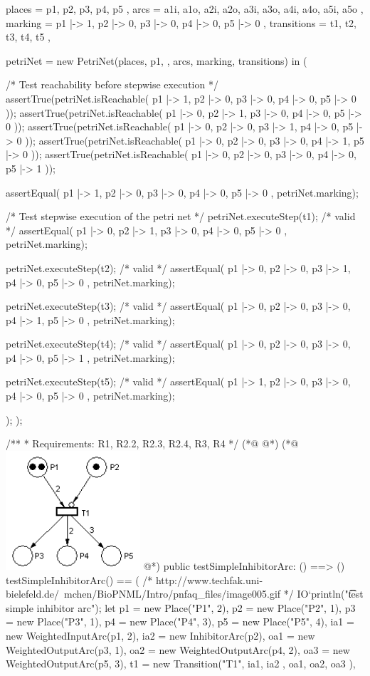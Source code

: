 \begin{vdmpp}
     places = { p1, p2, p3, p4, p5 },
     arcs = { a1i, a1o, a2i, a2o, a3i, a3o, a4i, a4o, a5i, a5o },
     marking = { p1 |-> 1, p2 |-> 0, p3 |-> 0, p4 |-> 0, p5 |-> 0 },
     transitions = { t1, t2, t3, t4, t5 },

     petriNet = new PetriNet(places, p1, {}, arcs, marking, transitions) in (

      /* Test reachability before stepwise execution */
      assertTrue(petriNet.isReachable({ p1 |-> 1, p2 |-> 0, p3 |-> 0, p4 |-> 0, p5 |-> 0 }));
      assertTrue(petriNet.isReachable({ p1 |-> 0, p2 |-> 1, p3 |-> 0, p4 |-> 0, p5 |-> 0 }));
      assertTrue(petriNet.isReachable({ p1 |-> 0, p2 |-> 0, p3 |-> 1, p4 |-> 0, p5 |-> 0 }));
      assertTrue(petriNet.isReachable({ p1 |-> 0, p2 |-> 0, p3 |-> 0, p4 |-> 1, p5 |-> 0 }));
      assertTrue(petriNet.isReachable({ p1 |-> 0, p2 |-> 0, p3 |-> 0, p4 |-> 0, p5 |-> 1 }));

      assertEqual({ p1 |-> 1, p2 |-> 0, p3 |-> 0, p4 |-> 0, p5 |-> 0 }, petriNet.marking);

      /* Test stepwise execution of the petri net */
      petriNet.executeStep(t1); /* valid */
      assertEqual({ p1 |-> 0, p2 |-> 1, p3 |-> 0, p4 |-> 0, p5 |-> 0 }, petriNet.marking);

      petriNet.executeStep(t2); /* valid */
      assertEqual({ p1 |-> 0, p2 |-> 0, p3 |-> 1, p4 |-> 0, p5 |-> 0 }, petriNet.marking);

      petriNet.executeStep(t3); /* valid */
      assertEqual({ p1 |-> 0, p2 |-> 0, p3 |-> 0, p4 |-> 1, p5 |-> 0 }, petriNet.marking);

      petriNet.executeStep(t4); /* valid */
      assertEqual({ p1 |-> 0, p2 |-> 0, p3 |-> 0, p4 |-> 0, p5 |-> 1 }, petriNet.marking);

      petriNet.executeStep(t5); /* valid */
      assertEqual({ p1 |-> 1, p2 |-> 0, p3 |-> 0, p4 |-> 0, p5 |-> 0 }, petriNet.marking);

    );
  );

  /**
   * Requirements: R1, R2.2, R2.3, R2.4, R3, R4
   */
(*@
\label{testSimpleInhibitorArc:178}
@*)
(*@
\includegraphics[width=5cm]{specification/simpleinhibitorarc.png}
@*)
  public testSimpleInhibitorArc: () ==> ()
  testSimpleInhibitorArc() == (
    /* http://www.techfak.uni-bielefeld.de/~mchen/BioPNML/Intro/pnfaq_files/image005.gif */
    IO`println("\t\t test simple inhibitor arc");
    let p1 = new Place("P1", 2),
     p2 = new Place("P2", 1),
     p3 = new Place("P3", 1),
     p4 = new Place("P4", 3),
     p5 = new Place("P5", 4),
     ia1 = new WeightedInputArc(p1,  2),
     ia2 = new InhibitorArc(p2),
     oa1 = new WeightedOutputArc(p3, 1),
     oa2 = new WeightedOutputArc(p4, 2),
     oa3 = new WeightedOutputArc(p5, 3),
     t1 = new Transition("T1", { ia1, ia2 }, { oa1, oa2, oa3 }),


\end{vdmpp}
